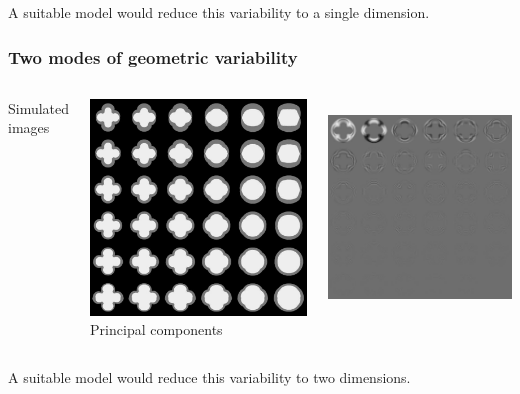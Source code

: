 \begin{frame}
\begin{columns}[c]
\end{columns}
A suitable model would reduce this variability to a single dimension.
\end{frame}




\begin{frame}
\frametitle{Two modes of geometric variability}
\begin{columns}[c]
Simulated images\par
\includegraphics[height=0.9\textwidth]{things}
Principal components\par
\includegraphics[height=0.9\textwidth]{things_pca}
\end{columns}
A suitable model would reduce this variability to two dimensions.
\end{frame}


